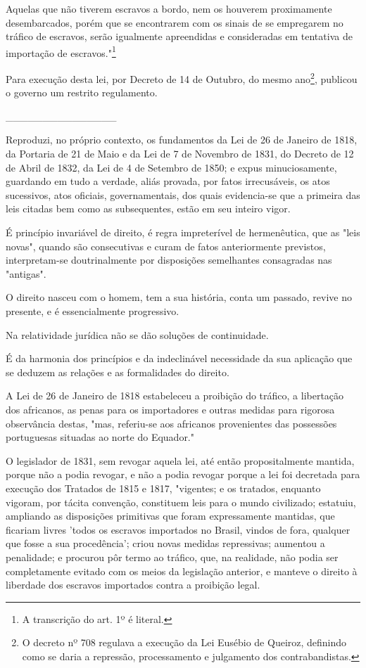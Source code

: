 Aquelas que não tiverem escravos a bordo, nem os houverem proximamente
desembarcados, porém que se encontrarem com os sinais de se empregarem
no tráfico de escravos, serão igualmente apreendidas e consideradas em
tentativa de importação de escravos."\footnote{A transcrição do art.
  1º é literal.}

Para execução desta lei, por Decreto de 14 de Outubro, do mesmo
ano\footnote{O decreto nº 708 regulava a execução da Lei Eusébio de
  Queiroz, definindo como se daria a repressão, processamento e
  julgamento dos contrabandistas.}, publicou o governo um restrito
regulamento.

\_\_\_\_\_\_\_\_\_\_\_\_\_\_\_

Reproduzi, no próprio contexto, os fundamentos da Lei de 26 de Janeiro
de 1818, da Portaria de 21 de Maio e da Lei de 7 de Novembro de 1831, do
Decreto de 12 de Abril de 1832, da Lei de 4 de Setembro de 1850; e expus
minuciosamente, guardando em tudo a verdade, aliás provada, por fatos
irrecusáveis, os atos sucessivos, atos oficiais, governamentais, dos
quais evidencia-se que a primeira das leis citadas bem como as
subsequentes, estão em seu inteiro vigor.

É princípio invariável de direito, é regra impreterível de hermenêutica,
que as "leis novas", quando são consecutivas e curam de fatos
anteriormente previstos, interpretam-se doutrinalmente por disposições
semelhantes consagradas nas "antigas".

O direito nasceu com o homem, tem a sua história, conta um passado,
revive no presente, e é essencialmente progressivo.

Na relatividade jurídica não se dão soluções de continuidade.

É da harmonia dos princípios e da indeclinável necessidade da sua
aplicação que se deduzem as relações e as formalidades do direito.

A Lei de 26 de Janeiro de 1818 estabeleceu a proibição do tráfico, a
libertação dos africanos, as penas para os importadores e outras medidas
para rigorosa observância destas, "mas, referiu-se aos africanos
provenientes das possessões portuguesas situadas ao norte do Equador."

O legislador de 1831, sem revogar aquela lei, até então propositalmente
mantida, porque não a podia revogar, e não a podia revogar porque a lei
foi decretada para execução dos Tratados de 1815 e 1817, "vigentes; e os
tratados, enquanto vigoram, por tácita convenção, constituem leis para o
mundo civilizado; estatuiu, ampliando as disposições primitivas que
foram expressamente mantidas, que ficariam livres 'todos os escravos
importados no Brasil, vindos de fora, qualquer que fosse a sua
procedência'; criou novas medidas repressivas; aumentou a penalidade; e
procurou pôr termo ao tráfico, que, na realidade, não podia ser
completamente evitado com os meios da legislação anterior, e manteve o
direito à liberdade dos escravos importados contra a proibição legal.

